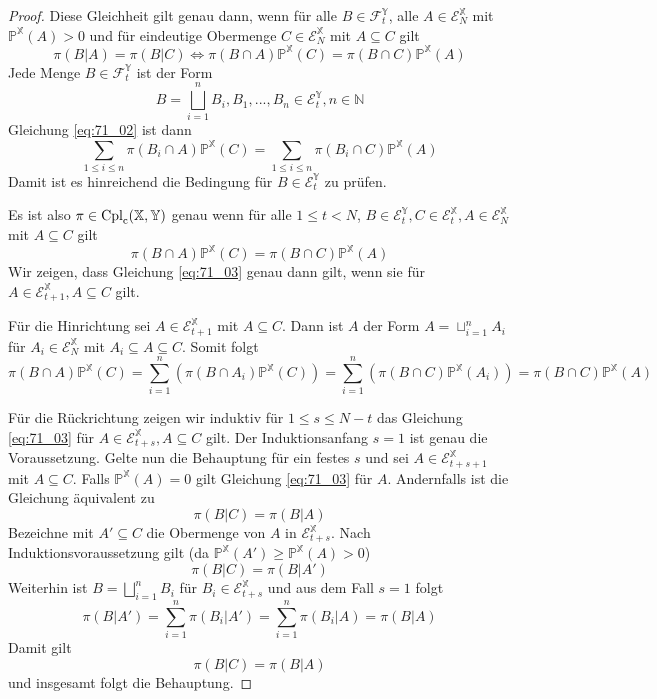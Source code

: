 \begin{proof}
Diese Gleichheit gilt genau dann, wenn für alle $B \in \mathcal{F}_t^\mathbb{Y}$, alle $A \in \mathcal{E}_N^\mathbb{X}$ mit $\mathbb{P}^\mathbb{X}(A)>0$ und für eindeutige Obermenge $C \in \mathcal{E}_N^\mathbb{X}$ mit $A\subseteq C$ gilt 
\begin{equation}\label{eq:71_02}
    \pi(B \vert A) = \pi(B \vert C) \Leftrightarrow \pi(B\cap A) \mathbb{P}^\mathbb{X}(C) = \pi(B\cap C) \mathbb{P}^{\mathbb{X}}(A)
\end{equation}
Jede Menge $B \in \mathcal{F}_t^\mathbb{Y}$ ist der Form
$$B = \bigsqcup_{i=1}^{n}B_i, B_1,...,B_n \in \mathcal{E}_t^\mathbb{Y}, n \in \mathbb{N}$$
Gleichung \ref{eq:71_02} ist dann 
$$\sum_{1\leq i\leq n} \pi(B_i \cap A) \mathbb{P}^\mathbb{X}(C) = \sum_{1\leq i\leq n}\pi(B_i \cap C) \mathbb{P}^\mathbb{X}(A)$$
Damit ist es hinreichend die Bedingung für $B \in \mathcal{E}_t^\mathbb{Y}$ zu prüfen. 

Es ist also $\pi \in \operatorname{Cpl}_{\operatorname{c}}(\mathbb{X}, \mathbb{Y})$ genau wenn für alle $1\leq t<N$, $B \in \mathcal{E}_t^\mathbb{Y}, C \in \mathcal{E}_t^\mathbb{X}, A \in \mathcal{E}_N^\mathbb{X}$ mit $A \subseteq C$ gilt
\begin{equation}\label{eq:71_03}
    \pi(B \cap A) \mathbb{P}^\mathbb{X}(C) = \pi(B\cap C) \mathbb{P}^\mathbb{X}(A)
\end{equation}
Wir zeigen, dass Gleichung \ref{eq:71_03} genau dann gilt, wenn sie für $A \in \mathcal{E}_{t+1}^\mathbb{X}, A \subseteq C$ gilt. 

Für die Hinrichtung sei $A \in \mathcal{E}_{t+1}^\mathbb{X}$ mit $A \subseteq C$. Dann ist $A$ der Form $A = \sqcup_{i=1}^{n} A_i$ für $A_i \in \mathcal{E}_N^\mathbb{X}$ mit $A_i \subseteq A \subseteq C$. 
Somit folgt
$$\pi(B\cap A)\mathbb{P}^\mathbb{X}(C) = \sum_{i=1}^n\left(\pi(B\cap A_i) \mathbb{P}^\mathbb{X}(C) \right) = \sum_{i=1}^n\left(\pi(B\cap C) \mathbb{P}^{\mathbb{X}}(A_i)\right) = \pi(B \cap C) \mathbb{P}^\mathbb{X}(A)$$

Für die Rückrichtung zeigen wir induktiv für $1 \leq s\leq N-t$ das Gleichung \ref{eq:71_03} für $A \in \mathcal{E}_{t+s}^\mathbb{X}, A\subseteq C$ gilt. Der Induktionsanfang $s=1$ ist genau die Voraussetzung. Gelte nun die Behauptung für ein festes $s$ und sei $A \in \mathcal{E}_{t+s+1}^\mathbb{X}$ mit $A \subseteq C$. Falls $\mathbb{P}^\mathbb{X}(A)=0$ gilt Gleichung \ref{eq:71_03} für $A$. Andernfalls ist die Gleichung äquivalent zu 
$$\pi(B \vert C) = \pi(B \vert A)$$
Bezeichne mit $A' \subseteq C$ die Obermenge von $A$ in $\mathcal{E}_{t+s}^\mathbb{X}$. Nach Induktionsvoraussetzung gilt (da $\mathbb{P}^\mathbb{X}(A') \geq \mathbb{P}^\mathbb{X}(A)> 0$)
$$\pi(B \vert C) = \pi(B \vert A')$$
Weiterhin ist $B = \bigsqcup_{i=1}^n B_i$ für $B_i \in \mathcal{E}_{t+s}^\mathbb{X}$ und aus dem Fall $s=1$ folgt
$$\pi(B \vert A') = \sum_{i=1}^n \pi(B_i \vert A') = \sum_{i=1}^n \pi(B_i \vert A) = \pi(B \vert A)$$
Damit gilt
$$\pi(B \vert C) = \pi(B \vert A)$$
und insgesamt folgt die Behauptung.
\end{proof}
